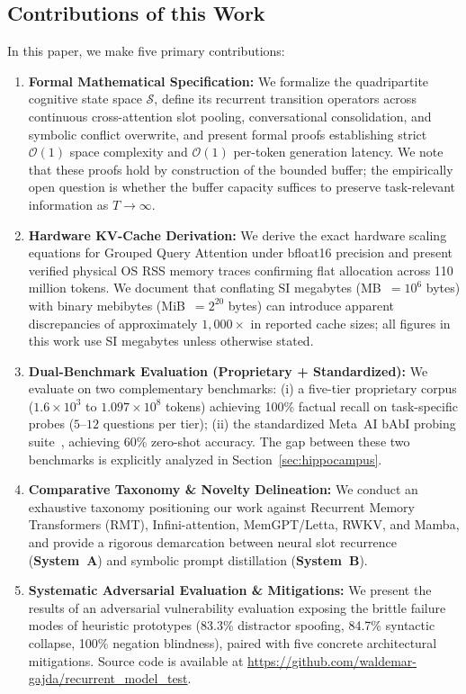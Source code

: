 \documentclass[11pt,a4paper]{article}
\begin{document}
\subsection{Contributions of this Work}
In this paper, we make five primary contributions:
\begin{enumerate}
    \item \textbf{Formal Mathematical Specification:} We formalize the quadripartite cognitive state space $\mathcal{S}$, define its recurrent transition operators across continuous cross-attention slot pooling, conversational consolidation, and symbolic conflict overwrite, and present formal proofs establishing strict $\mathcal{O}(1)$ space complexity and $\mathcal{O}(1)$ per-token generation latency. We note that these proofs hold by construction of the bounded buffer; the empirically open question is whether the buffer capacity suffices to preserve task-relevant information as $T \to \infty$.
    \item \textbf{Hardware KV-Cache Derivation:} We derive the exact hardware scaling equations for Grouped Query Attention under bfloat16 precision and present verified physical OS RSS memory traces confirming flat allocation across 110 million tokens. We document that conflating SI megabytes (MB~$=10^6$ bytes) with binary mebibytes (MiB~$=2^{20}$ bytes) can introduce apparent discrepancies of approximately $1,000\times$ in reported cache sizes; all figures in this work use SI megabytes unless otherwise stated.
    \item \textbf{Dual-Benchmark Evaluation (Proprietary + Standardized):} We evaluate on two complementary benchmarks: (i) a five-tier proprietary corpus ($1.6\times 10^3$ to $1.097\times 10^8$ tokens) achieving 100\% factual recall on task-specific probes ($5$--$12$ questions per tier); (ii) the standardized Meta~AI bAbI probing suite~\cite{weston2015towards}, achieving 60\% zero-shot accuracy. The gap between these two benchmarks is explicitly analyzed in Section~\ref{sec:hippocampus}.
    \item \textbf{Comparative Taxonomy \& Novelty Delineation:} We conduct an exhaustive taxonomy positioning our work against Recurrent Memory Transformers (RMT), Infini-attention, MemGPT/Letta, RWKV, and Mamba, and provide a rigorous demarcation between neural slot recurrence (\textbf{System~A}) and symbolic prompt distillation (\textbf{System~B}).
    \item \textbf{Systematic Adversarial Evaluation \& Mitigations:} We present the results of an adversarial vulnerability evaluation exposing the brittle failure modes of heuristic prototypes (83.3\% distractor spoofing, 84.7\% syntactic collapse, 100\% negation blindness), paired with five concrete architectural mitigations. Source code is available at \url{https://github.com/waldemar-gajda/recurrent_model_test}.
\end{enumerate}
\end{document}
